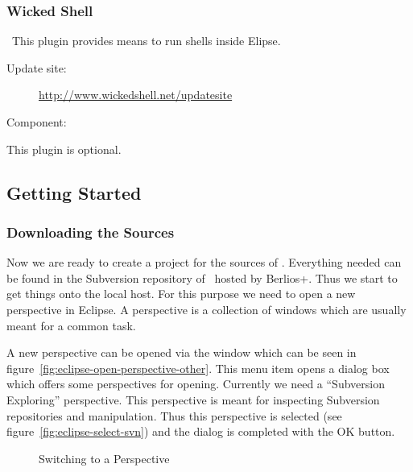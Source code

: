 \subsubsection{Wicked Shell}\
This plugin provides means to run shells inside Elipse.
\begin{description}
\item [Update site:] \url{http://www.wickedshell.net/updatesite}
\item [Component:] \menu{Wicked Shell}
\end{description}
This plugin is optional.
%


\subsection{Getting Started}

\subsubsection{Downloading the Sources}

Now we are ready to create a project for the sources of \ExTeX.
Everything needed can be found in the Subversion repository of \ExTeX\ 
hosted by \+Berlios+. Thus we start to get things onto the local host.
For this purpose we need to open a new perspective in Eclipse. A
perspective is a collection of windows which are usually meant for a
common task.

A new perspective can be opened via the
window  which can
be seen in figure~\ref{fig:eclipse-open-perspective-other}. This menu
item opens a dialog box which offers some perspectives for opening.
Currently we need a ``Subversion Exploring'' perspective. This
perspective is meant for inspecting Subversion repositories and
manipulation. Thus this perspective is selected (see
figure~\ref{fig:eclipse-select-svn}) and the dialog is completed with
the OK button.
\begin{figure}[ht]
  \hbox{}\hfill
  \hfill
  \hfill\hbox{}

  \caption{Switching to a Perspective}\label{fig:eclipse-perspective}
\end{figure}

